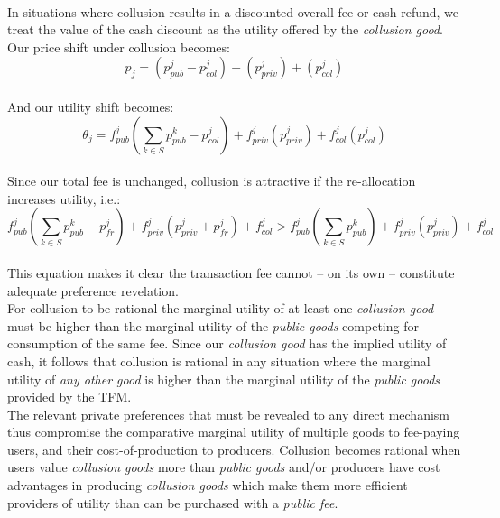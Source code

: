 \documentclass[11pt,a4paper]{llncs}
\begin{document}
\vspace{0.2cm} \\
In situations where collusion results in a discounted overall fee or cash refund, we treat the value of the cash discount as the utility offered by the \textit{collusion good}.
\vspace{0.2cm} \\
Our price shift under collusion becomes:
\vspace{0.2cm} \\
$$
p_j = \left( p_{pub}^j - p_{col}^j \right) + \left( p_{priv}^j \right) + \left( p_{col}^j \right)
$$
\vspace{0.2cm} \\
And our utility shift becomes:
\vspace{0.2cm} \\
$$
\theta_j = f_{pub}^j\left(\sum_{k \in S} p_{pub}^{k} - p_{col}^j \right) + f_{priv}^j\left( p_{priv}^j \right) + f_{col}^j\left(p_{col}^j \right)
$$
\vspace{0.2cm} \\
Since our total fee is unchanged, collusion is attractive if the re-allocation increases utility, i.e.:
\vspace{0.2cm} \\
\[
f_{pub}^j\left(\sum_{k \in S} p_{pub}^{k} - p_{fr}^j \right) + f_{priv}^j( p_{priv}^j + p_{fr}^j ) + f_{col}^j
>
f_{pub}^j\left(\sum_{k \in S} p_{pub}^{k}\right) + f_{priv}^j(p_{priv}^j) + f_{col}^j
\]
\vspace{0.2cm} \\
This equation makes it clear the transaction fee cannot -- on its own -- constitute adequate preference revelation.
\vspace{0.2cm} \\
For collusion to be rational the marginal utility of at least one \textit{collusion good} must be higher than the marginal utility of the \textit{public goods} competing for consumption of the same fee. Since our \textit{collusion good} has the implied utility of cash, it follows that collusion is rational in any situation where the marginal utility of \textit{any other good} is higher than the marginal utility of the \textit{public goods} provided by the TFM.
\vspace{0.2cm} \\
The relevant private preferences that must be revealed to any direct mechanism thus compromise the comparative marginal utility of multiple goods to fee-paying users, and their cost-of-production to producers. Collusion becomes rational when users value \textit{collusion goods} more than \textit{public goods} and/or producers have cost advantages in producing \textit{collusion goods} which make them more efficient providers of utility than can be purchased with a \textit{public fee}.
\end{document}
